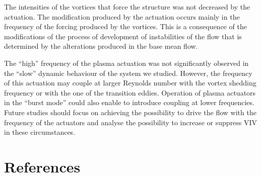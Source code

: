 \documentclass[review]{elsarticle}
\begin{document}
The intensities of the vortices that force the structure was not decreased by the actuation. The modification produced by the actuation occurs mainly in the frequency of the forcing produced by the vortices. This is a consequence of the modifications of the process of development of instabilities of the flow that is determined by the alterations produced in the base mean flow.

The ``high'' frequency of the plasma actuation was not significantly  observed in the ``slow'' dynamic behaviour of the system we studied. However, the frequency of this actuation may couple at larger Reynolds number with the vortex shedding frequency or with the one of the transition eddies. Operation of plasma actuators in the ``burst mode'' could also enable to introduce coupling  at  lower frequencies.  Future studies should focus on achieving the possibility to drive the flow with the frequency of the actuators and analyse the possibility to increase or suppress VIV in these circumstances. 

\section*{References}




\end{document}
